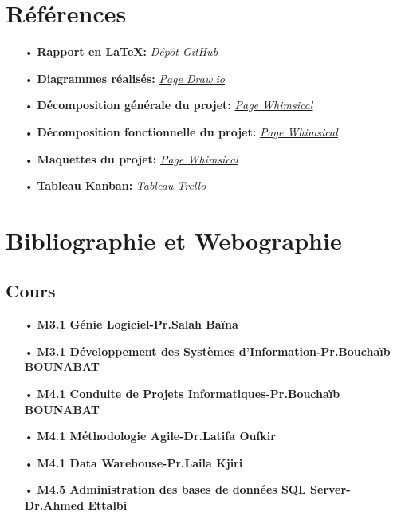 \documentclass[a4paper]{report}
\begin{document}
\begin{doublespace}
	\newpage


	\appendix
	 \setcounter{page}{1}
	\chapter{Références}

	\begin{itemize}
		\item[•] \textbf{Rapport en \LaTeX:} \href{https://github.com/abdorah/stage2021/blob/master/rapport.tex}{\textit{Dépôt GitHub}}
		\item[•] \textbf{Diagrammes réalisés:} \href{https://viewer.diagrams.net/?tags=&highlight=0000ff&edit=_blank&layers=1&nav=1&title=Diagram.drawio#Uhttps%3A%2F%2Fraw.githubusercontent.com%2Fabdorah%2Fstage2021%2Fmaster%2Fdiagramms%2FDiagram.drawio}{\textit{Page Draw.io}}
		\item[•] \textbf{Décomposition générale du projet:} \href{https://whimsical.com/kdi-EkDMmetu6dBHRpCbyDF1yy}{\textit{Page Whimsical}}
		\item[•] \textbf{Décomposition fonctionnelle du projet:} \href{https://whimsical.com/wbs-kpi-9BDZ7oPFWEhvz9qQGoQEdL}{\textit{Page Whimsical}}
		\item[•] \textbf{Maquettes du projet:} \href{https://whimsical.com/kdi-ux-design-J9PD866564ibwyMBwLHN9N}{\textit{Page Whimsical}}
		\item[•] \textbf{Tableau Kanban:} \href{https://trello.com/invite/b/QCUhh5sY/900fa738fc6c66193db04199e1248ae6/suivitransport}{\textit{Tableau Trello}}
	\end{itemize}

	\chapter{Bibliographie et Webographie}

	\section{Cours}

	\begin{itemize}
		\item[•] \textbf{M3.1 Génie Logiciel-Pr.Salah Baïna}
		\item[•] \textbf{M3.1 Développement des Systèmes d’Information-Pr.Bouchaïb BOUNABAT}
		\item[•] \textbf{M4.1 Conduite de Projets Informatiques-Pr.Bouchaïb BOUNABAT}
		\item[•] \textbf{M4.1 Méthodologie Agile-Dr.Latifa Oufkir}
		\item[•] \textbf{M4.1 Data Warehouse-Pr.Laila Kjiri}
		\item[•] \textbf{M4.5 Administration des bases de données SQL Server-Dr.Ahmed Ettalbi}
	\end{itemize}


\end{doublespace}
\end{document}
